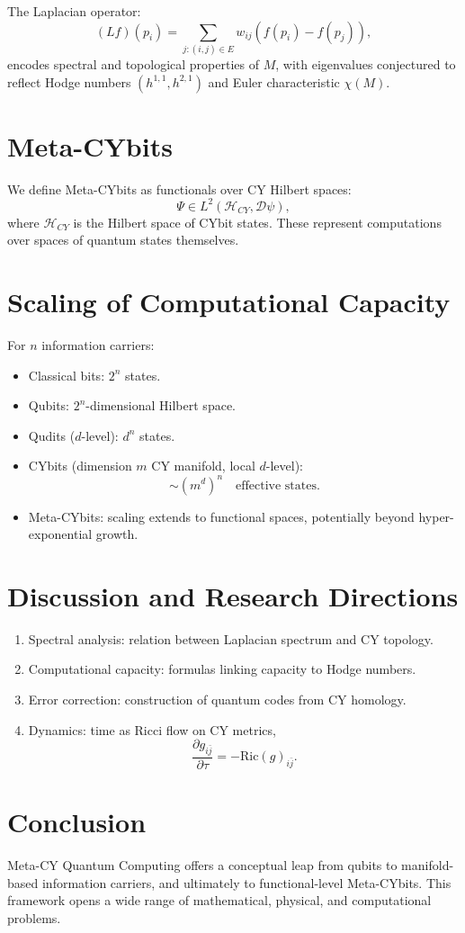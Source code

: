 \documentclass[12pt,a4paper]{article}
\begin{document}
The Laplacian operator:
\[
(Lf)(p_i) = \sum_{j:(i,j)\in E} w_{ij}(f(p_i)-f(p_j)),
\]
encodes spectral and topological properties of $M$, 
with eigenvalues conjectured to reflect Hodge numbers $(h^{1,1},h^{2,1})$ 
and Euler characteristic $\chi(M)$.

\section{Meta-CYbits}
We define Meta-CYbits as functionals over CY Hilbert spaces:
\[
\Psi \in L^2(\mathcal{H}_{CY}, \mathcal{D}\psi),
\]
where $\mathcal{H}_{CY}$ is the Hilbert space of CYbit states.
These represent computations over spaces of quantum states themselves.

\section{Scaling of Computational Capacity}
For $n$ information carriers:
\begin{itemize}
\item Classical bits: $2^n$ states.  
\item Qubits: $2^n$-dimensional Hilbert space.  
\item Qudits ($d$-level): $d^n$ states.  
\item CYbits (dimension $m$ CY manifold, local $d$-level): 
\[
\sim (m^d)^n \quad \text{effective states}.
\]
\item Meta-CYbits: scaling extends to functional spaces, potentially 
beyond hyper-exponential growth.
\end{itemize}

\section{Discussion and Research Directions}
\begin{enumerate}
\item Spectral analysis: relation between Laplacian spectrum and CY topology.  
\item Computational capacity: formulas linking capacity to Hodge numbers.  
\item Error correction: construction of quantum codes from CY homology.  
\item Dynamics: time as Ricci flow on CY metrics,
\[
\frac{\partial g_{i\bar{j}}}{\partial \tau} = - \mathrm{Ric}(g)_{i\bar{j}}.
\]
\end{enumerate}

\section{Conclusion}
Meta-CY Quantum Computing offers a conceptual leap 
from qubits to manifold-based information carriers, 
and ultimately to functional-level Meta-CYbits. 
This framework opens a wide range of mathematical, physical, 
and computational problems.
\end{document}
